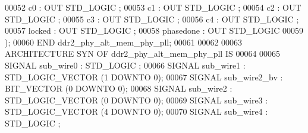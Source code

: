 \begin{DoxyCode}
{00052         \textcolor{vhdlchar}{c0}      \textcolor{vhdlchar}{:} \textcolor{keywordflow}{OUT} \textcolor{comment}{STD\_LOGIC} ;
00053         \textcolor{vhdlchar}{c1}      \textcolor{vhdlchar}{:} \textcolor{keywordflow}{OUT} \textcolor{comment}{STD\_LOGIC} ;
00054         \textcolor{vhdlchar}{c2}      \textcolor{vhdlchar}{:} \textcolor{keywordflow}{OUT} \textcolor{comment}{STD\_LOGIC} ;
00055         \textcolor{vhdlchar}{c3}      \textcolor{vhdlchar}{:} \textcolor{keywordflow}{OUT} \textcolor{comment}{STD\_LOGIC} ;
00056         \textcolor{vhdlchar}{c4}      \textcolor{vhdlchar}{:} \textcolor{keywordflow}{OUT} \textcolor{comment}{STD\_LOGIC} ;
00057         locked      : \textcolor{keywordflow}{OUT} \textcolor{comment}{STD\_LOGIC} ;
00058         \textcolor{vhdlchar}{phasedone}       \textcolor{vhdlchar}{:} \textcolor{keywordflow}{OUT} \textcolor{comment}{STD\_LOGIC} 
00059     \textcolor{vhdlchar}{)};
00060 \textcolor{keywordflow}{END} \textcolor{vhdlchar}{ddr2\_phy\_alt\_mem\_phy\_pll};
00061 
00062 
00063 \textcolor{keywordflow}{ARCHITECTURE} SYN \textcolor{keywordflow}{OF} ddr2_phy_alt_mem_phy_pll IS
00064 
00065     \textcolor{keywordflow}{SIGNAL} \textcolor{vhdlchar}{sub_wire0}    \textcolor{vhdlchar}{:} \textcolor{comment}{STD\_LOGIC} ;
00066     \textcolor{keywordflow}{SIGNAL} \textcolor{vhdlchar}{sub_wire1}    \textcolor{vhdlchar}{:} \textcolor{comment}{STD\_LOGIC\_VECTOR} \textcolor{vhdlchar}{(}\textcolor{vhdllogic}{}\textcolor{vhdllogic}{1} \textcolor{keywordflow}{DOWNTO} \textcolor{vhdllogic}{}\textcolor{vhdllogic}{0}\textcolor{vhdlchar}{)};
00067     \textcolor{keywordflow}{SIGNAL} \textcolor{vhdlchar}{sub_wire2_bv} \textcolor{vhdlchar}{:} \textcolor{comment}{BIT\_VECTOR} \textcolor{vhdlchar}{(}\textcolor{vhdllogic}{}\textcolor{vhdllogic}{0} \textcolor{keywordflow}{DOWNTO} \textcolor{vhdllogic}{}\textcolor{vhdllogic}{0}\textcolor{vhdlchar}{)};
00068     \textcolor{keywordflow}{SIGNAL} \textcolor{vhdlchar}{sub_wire2}    \textcolor{vhdlchar}{:} \textcolor{comment}{STD\_LOGIC\_VECTOR} \textcolor{vhdlchar}{(}\textcolor{vhdllogic}{}\textcolor{vhdllogic}{0} \textcolor{keywordflow}{DOWNTO} \textcolor{vhdllogic}{}\textcolor{vhdllogic}{0}\textcolor{vhdlchar}{)};
00069     \textcolor{keywordflow}{SIGNAL} \textcolor{vhdlchar}{sub_wire3}    \textcolor{vhdlchar}{:} \textcolor{comment}{STD\_LOGIC\_VECTOR} \textcolor{vhdlchar}{(}\textcolor{vhdllogic}{}\textcolor{vhdllogic}{4} \textcolor{keywordflow}{DOWNTO} \textcolor{vhdllogic}{}\textcolor{vhdllogic}{0}\textcolor{vhdlchar}{)};
00070     \textcolor{keywordflow}{SIGNAL} \textcolor{vhdlchar}{sub_wire4}    \textcolor{vhdlchar}{:} \textcolor{comment}{STD\_LOGIC} ;
}
\end{DoxyCode}
